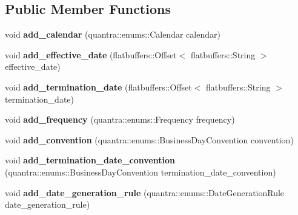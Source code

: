 \subsection*{Public Member Functions}
\begin{DoxyCompactItemize}
\item 
\mbox{\label{structquantra_1_1ScheduleBuilder_adf7555a0cf543c30dbe1ef2ab4d1c805}} 
void {\bfseries add\+\_\+calendar} (quantra\+::enums\+::\+Calendar calendar)
\item 
\mbox{\label{structquantra_1_1ScheduleBuilder_a1f175c88c60f66ea84e9a11a23a3b34c}} 
void {\bfseries add\+\_\+effective\+\_\+date} (flatbuffers\+::\+Offset$<$ flatbuffers\+::\+String $>$ effective\+\_\+date)
\item 
\mbox{\label{structquantra_1_1ScheduleBuilder_acf922cb3d851112454b213e43706bbae}} 
void {\bfseries add\+\_\+termination\+\_\+date} (flatbuffers\+::\+Offset$<$ flatbuffers\+::\+String $>$ termination\+\_\+date)
\item 
\mbox{\label{structquantra_1_1ScheduleBuilder_a5858716bdd72e1711cbfbfd127467c7e}} 
void {\bfseries add\+\_\+frequency} (quantra\+::enums\+::\+Frequency frequency)
\item 
\mbox{\label{structquantra_1_1ScheduleBuilder_a1a84349a8129980665dc490242b70398}} 
void {\bfseries add\+\_\+convention} (quantra\+::enums\+::\+Business\+Day\+Convention convention)
\item 
\mbox{\label{structquantra_1_1ScheduleBuilder_a540ca9961bfab67d8e1054d4e44c5927}} 
void {\bfseries add\+\_\+termination\+\_\+date\+\_\+convention} (quantra\+::enums\+::\+Business\+Day\+Convention termination\+\_\+date\+\_\+convention)
\item 
\mbox{\label{structquantra_1_1ScheduleBuilder_a7b52dda4939d4a832b006a7d039ab4cf}} 
void {\bfseries add\+\_\+date\+\_\+generation\+\_\+rule} (quantra\+::enums\+::\+Date\+Generation\+Rule date\+\_\+generation\+\_\+rule)
\item 
\mbox{\label{structquantra_1_1ScheduleBuilder_a4f0fafbc304a56cb9362249cb15c6777}} 

\end{DoxyCompactItemize}
